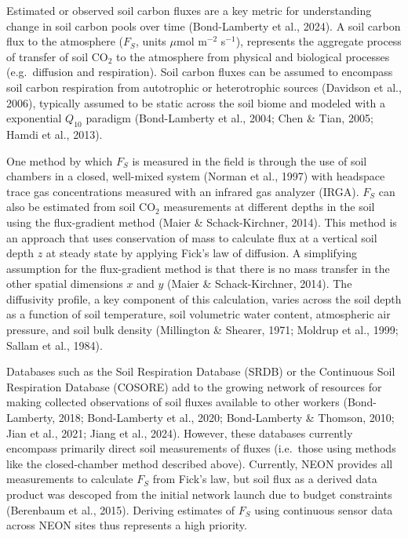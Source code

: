 \documentclass[
  letterpaper,
  DIV=11,
  numbers=noendperiod]{scrartcl}
\begin{document}
Estimated or observed soil carbon fluxes are a key metric for
understanding change in soil carbon pools over time (Bond-Lamberty et
al., 2024). A soil carbon flux to the atmosphere (\(F_{S}\), units
\(\mu\)mol m\(^{-2}\) s\(^{-1}\)), represents the aggregate process of
transfer of soil CO\(_{2}\) to the atmosphere from physical and
biological processes (e.g.~diffusion and respiration). Soil carbon
fluxes can be assumed to encompass soil carbon respiration from
autotrophic or heterotrophic sources (Davidson et al., 2006), typically
assumed to be static across the soil biome and modeled with a
exponential \(Q_{10}\) paradigm (Bond-Lamberty et al., 2004; Chen \&
Tian, 2005; Hamdi et al., 2013).

One method by which \(F_{S}\) is measured in the field is through the
use of soil chambers in a closed, well-mixed system (Norman et al.,
1997) with headspace trace gas concentrations measured with an infrared
gas analyzer (IRGA). \(F_{S}\) can also be estimated from soil
CO\(_{2}\) measurements at different depths in the soil using the
flux-gradient method (Maier \& Schack-Kirchner, 2014). This method is an
approach that uses conservation of mass to calculate flux at a vertical
soil depth \(z\) at steady state by applying Fick's law of diffusion. A
simplifying assumption for the flux-gradient method is that there is no
mass transfer in the other spatial dimensions \(x\) and \(y\) (Maier \&
Schack-Kirchner, 2014). The diffusivity profile, a key component of this
calculation, varies across the soil depth as a function of soil
temperature, soil volumetric water content, atmospheric air pressure,
and soil bulk density (Millington \& Shearer, 1971; Moldrup et al.,
1999; Sallam et al., 1984).

Databases such as the Soil Respiration Database (SRDB) or the Continuous
Soil Respiration Database (COSORE) add to the growing network of
resources for making collected observations of soil fluxes available to
other workers (Bond-Lamberty, 2018; Bond-Lamberty et al., 2020;
Bond-Lamberty \& Thomson, 2010; Jian et al., 2021; Jiang et al., 2024).
However, these databases currently encompass primarily direct soil
measurements of fluxes (i.e.~those using methods like the closed-chamber
method described above). Currently, NEON provides all measurements to
calculate \(F_{S}\) from Fick's law, but soil flux as a derived data
product was descoped from the initial network launch due to budget
constraints (Berenbaum et al., 2015). Deriving estimates of \(F_{S}\)
using continuous sensor data across NEON sites thus represents a high
priority.
\end{document}
